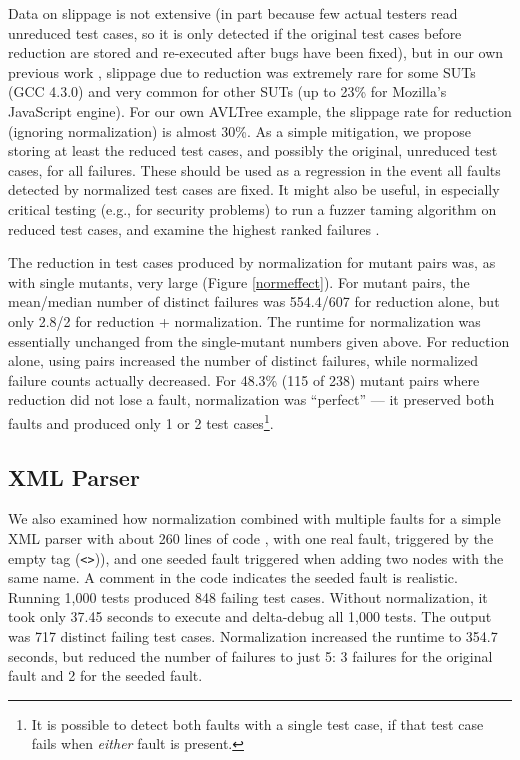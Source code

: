 Data on slippage is not extensive (in part because few actual testers
read unreduced test cases, so it is only detected if the original test
cases before reduction are stored and re-executed after bugs have been
fixed), but in our own previous work \cite{PLDI13}, slippage due to
reduction was extremely rare for some SUTs (GCC 4.3.0) and very common
for other SUTs (up to 23\% for Mozilla's JavaScript engine).  For our
own AVLTree example, the slippage rate for reduction (ignoring
normalization) is almost 30\%.  As a simple mitigation, we propose
storing at least the reduced test cases, and possibly the original,
unreduced test cases, for all failures.  These should be used as a
regression in the event all faults detected by normalized test cases
are fixed.  It might also be useful, in especially critical testing
(e.g., for security problems) to run a fuzzer taming algorithm on
reduced test cases, and examine the highest ranked failures \cite{PLDI13}.

The reduction in test cases produced by normalization for mutant pairs
was, as with single mutants, very large (Figure \ref{normeffect}).
For mutant pairs, the mean/median number of distinct failures was
554.4/607 for reduction alone, but only 2.8/2 for reduction +
normalization.  The runtime for normalization was essentially
unchanged from the single-mutant numbers given above.  For reduction
alone, using pairs increased the number of distinct failures, while
normalized failure counts actually decreased.  For 48.3\% (115 of 238)
mutant pairs where reduction did not lose a fault, normalization was
``perfect'' --- it preserved both faults and produced only 1 or 2 test
cases\footnote{It is possible to detect both faults with a single test
  case, if that test case fails when \emph{either} fault is
  present.}. 

\subsection{XML Parser}

We also examined how normalization combined with multiple faults for a
simple XML parser with about 260 lines of code \cite{myxml}, with one
real fault, triggered by the empty tag ({\tt <>})), and one
seeded fault triggered when adding two nodes with the same
name.  A comment in the code indicates the seeded fault is realistic.  Running 1,000 tests
produced 848 failing test cases.  Without normalization, it took only
37.45 seconds to execute and delta-debug all 1,000 tests.  The output was 717 distinct failing test
cases.  Normalization increased the runtime to 354.7 seconds, but
reduced the number of failures to just 5: 3 failures
for the original fault and 2 for the seeded fault.


